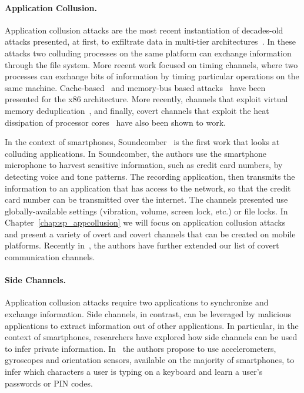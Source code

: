 \paragraph{Application Collusion.}
Application collusion attacks are the most recent instantiation of decades-old attacks presented, at first, to exfiltrate data in multi-tier architectures~\cite{Lampson:note_on_confinment}. In these attacks two colluding processes on the same platform can exchange information through the file system. More recent work focused on timing channels, where two processes can exchange bits of information by timing particular operations on the same machine. Cache-based~\cite{Reducing_timing_channels_with_fuzzy_time} and memory-bus based attacks~\cite{hu-sp92,wu-usenix12} have been presented for the x86 architecture. More recently, channels that exploit virtual memory deduplication~\cite{xiao-dsn13}, and finally, covert channels that exploit the heat dissipation of processor cores~\cite{ramyaheat} have also been shown to work.

In the context of smartphones, Soundcomber~\cite{soundcomber-ndss} is the first work that looks at colluding applications. In Soundcomber, the authors use the smartphone microphone to harvest sensitive information, such as credit card numbers, by detecting voice and tone patterns. The recording application, then transmits the information to an application that has access to the network, so that the credit card number can be transmitted over the internet. The channels presented use globally-available settings (vibration, volume, screen lock, etc.) or file locks. In Chapter~\ref{chap:sp_appcollusion} we will focus on application collusion attacks and present a variety of overt and covert channels that can be created on mobile platforms. Recently in~\cite{lalande13}, the authors have further extended our list of covert communication channels.

\paragraph{Side Channels.}
Application collusion attacks require two applications to synchronize and exchange information. Side channels, in contrast, can be leveraged by malicious applications to extract information out of other applications. In particular, in the context of smartphones, researchers have explored how side channels can be used to infer private information. In~\cite{touchlogger11,taplogger12,accessory12} the authors propose to use accelerometers, gyroscopes and orientation sensors, available on the majority of smartphones, to infer which characters a user is typing on a keyboard and learn a user's passwords or PIN codes.

